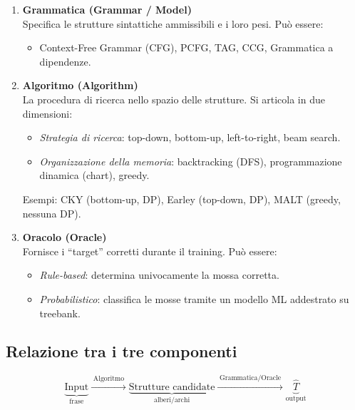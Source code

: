 \documentclass[12pt,a4paper]{article}
\begin{document}
\begin{defbox}
\begin{enumerate}[leftmargin=1.5em, label=\textbf{\arabic*.}]
  \item \textbf{Grammatica (Grammar / Model)}\\
    Specifica le strutture sintattiche ammissibili e i loro pesi. Può essere:
    \begin{itemize}[leftmargin=1.5em, nosep]
      \item Context-Free Grammar (CFG), PCFG, TAG, CCG, Grammatica a dipendenze.
    \end{itemize}

  \item \textbf{Algoritmo (Algorithm)}\\
    La procedura di ricerca nello spazio delle strutture. Si articola in due dimensioni:
    \begin{itemize}[leftmargin=1.5em, nosep]
      \item \emph{Strategia di ricerca}: top-down, bottom-up, left-to-right, beam search.
      \item \emph{Organizzazione della memoria}: backtracking (DFS), programmazione dinamica (chart), greedy.
    \end{itemize}
    Esempi: CKY (bottom-up, DP), Earley (top-down, DP), MALT (greedy, nessuna DP).

  \item \textbf{Oracolo (Oracle)}\\
    Fornisce i ``target'' corretti durante il training. Può essere:
    \begin{itemize}[leftmargin=1.5em, nosep]
      \item \emph{Rule-based}: determina univocamente la mossa corretta.
      \item \emph{Probabilistico}: classifica le mosse tramite un modello ML addestrato su treebank.
    \end{itemize}
\end{enumerate}
\end{defbox}

\subsection{Relazione tra i tre componenti}

\[
\underbrace{\text{Input}}_{\text{frase}} \xrightarrow{\;\text{Algoritmo}\;} \underbrace{\text{Strutture candidate}}_{\text{alberi/archi}} \xrightarrow{\;\text{Grammatica/Oracle}\;} \underbrace{\hat{T}}_{\text{output}}
\]
\end{document}
